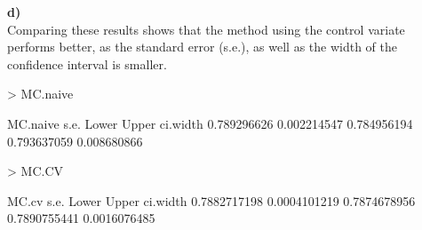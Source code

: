 \documentclass{article}
\begin{document}
\textbf{d)} \\
Comparing these results shows that the method using the control variate performs better, as the standard error (s.e.), as well as the width of the confidence interval is smaller.
\begin{Schunk}
\begin{Sinput}
> MC.naive
\end{Sinput}
\begin{Soutput}
   MC.naive        s.e.       Lower       Upper    ci.width 
0.789296626 0.002214547 0.784956194 0.793637059 0.008680866 
\end{Soutput}
\begin{Sinput}
> MC.CV
\end{Sinput}
\begin{Soutput}
       MC.cv         s.e.        Lower        Upper     ci.width 
0.7882717198 0.0004101219 0.7874678956 0.7890755441 0.0016076485 
\end{Soutput}
\end{Schunk}
\end{document}
